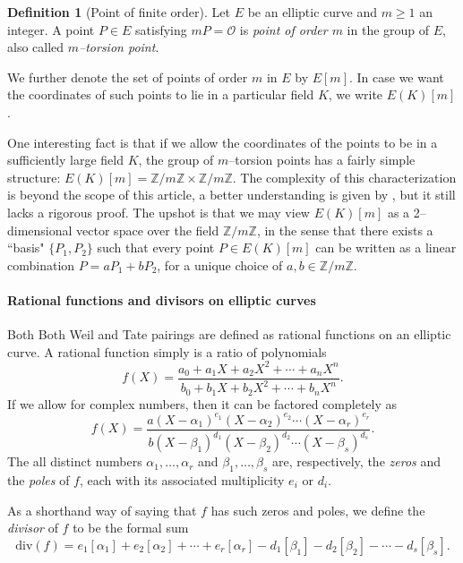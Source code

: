 \documentclass[9pt]{article}
\theoremstyle{definition}
\newtheorem{definition}{Definition}[section]
\begin{document}
\begin{definition}[Point of finite order]
Let $E$ be an elliptic curve and $m \geq 1$ an integer. A point $P \in E$ satisfying $mP = \mathcal{O}$ is \textit{point of order $m$} in the group of $E$, also called \textit{$m$--torsion point}.

We further denote the set of points of order $m$ in $E$ by $E[m]$. In case we want the coordinates of such points to lie in a particular field $K$, we write $E(K)[m]$.
\end{definition}

One interesting fact is that if we allow the coordinates of the points to be in a sufficiently large field $K$, the group of $m$--torsion points has a fairly simple structure: $E(K)[m] = \mathbb{Z}/m\mathbb{Z} \times \mathbb{Z}/m\mathbb{Z}$. The complexity of this characterization is beyond the scope of this article, a better understanding is given by \cite[Proposition~5.33]{JH08}, but it still lacks a rigorous proof. The upshot is that we may view $E(K)[m]$ as a 2--dimensional vector space over the field $\mathbb{Z}/m\mathbb{Z}$, in the sense that there exists a ``basis" $\{ P_1, P_2 \}$ such that every point $P \in E(K)[m]$ can be written as a linear combination $P = a P_1 + b P_2$, for a unique choice of $a,b \in \mathbb{Z}/m\mathbb{Z}$.

\paragraph{Rational functions and divisors on elliptic curves} Both Both Weil and Tate pairings are defined as rational functions on an elliptic curve. A rational function simply is a ratio of polynomials 
$$f(X) = \frac{a_0 + a_1 X + a_2 X^2 + \cdots + a_n X^n}{b_0 + b_1 X + b_2 X^2 + \cdots + b_n X^n}.$$
If we allow for complex numbers, then it can be factored completely as
$$f(X)= \frac{a (X - \alpha_1)^{e_1} (X - \alpha_2)^{e_2} \cdots (X - \alpha_r)^{e_r} }{b (X - \beta_1)^{d_1} (X - \beta_2)^{d_2} \cdots (X - \beta_s)^{d_s}}.$$
The all distinct numbers $\alpha_1, \dots, \alpha_r$ and $\beta_1, \dots, \beta_s$ are, respectively, the \textit{zeros} and the \textit{poles} of $f$, each with its associated multiplicity $e_i$ or $d_i$.

As a shorthand way of saying that $f$ has such zeros and poles, we define the \textit{divisor} of $f$ to be the formal sum
$$\text{div}(f) = e_1 [\alpha_1] + e_2 [\alpha_2] + \cdots + e_r [\alpha_r] - d_1 [\beta_1] - d_2 [\beta_2] - \cdots - d_s [\beta_s].$$
\end{document}

